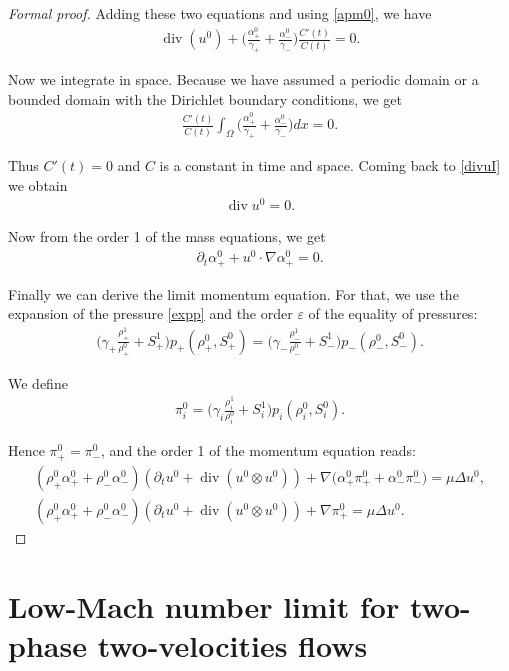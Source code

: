 \documentclass[11pt, twoside, a4paper]{article}
\theoremstyle{plain}
\theoremstyle{remark}
\numberwithin{equation}{section}
\renewcommand{\div}{\operatorname{div}}
\newcommand{\dt}{\partial_t}
\newcommand{\eps}{\varepsilon}
\newcommand{\ap}{\alpha_+}
\newcommand{\am}{\alpha_-}
\newcommand{\rp}{\rho_+}
\newcommand{\rmi}{\rho_-}
\newcommand{\gp}{\gamma_{+}}
\newcommand{\gm}{\gamma_-}
\begin{document}
\begin{proof}[Formal proof]
Adding these two equations and using \eqref{apm0}, we have
\begin{align}
    \div (u^0) + \Big( \frac{\ap^0}{\gp} + \frac{\am^0}{\gm} \Big) \frac{C'(t)}{C(t)}=0.\label{divuI}
\end{align}

Now we integrate in space. Because we have assumed a periodic domain or a bounded domain with the Dirichlet boundary conditions, we get
\begin{align*}
    \frac{C'(t)}{C(t)} \int_\Omega \Big( \frac{\ap^0}{\gp} + \frac{\am^0}{\gm} \Big) d x   =0.
\end{align*}

Thus $C'(t) = 0$ and $C$ is a constant in time and space. Coming back to \eqref{divuI} we obtain
\begin{align*}
    \div u^0 = 0.
\end{align*}

Now from the order 1 of the mass equations, we get
\begin{align*}
    \dt \ap^0 + u^0 \cdot \nabla \ap^0 =0.
\end{align*}

Finally we can derive the limit momentum equation. For that, we use the expansion of the pressure \eqref{expp} and the order $\eps$ of the equality of pressures:
\begin{align*}
    \Big( \gamma_+ \frac{\rp^1}{\rp^0} + S_+^1 \Big) p_+(\rp^0,S_+^0) = \Big( \gm \frac{\rmi^1}{\rmi^0} + S_-^1 \Big) p_-(\rmi^0,S_-^0).
\end{align*}

We define
\begin{align*}
    \pi_i^0 = \Big( \gamma_i \frac{\rho_i^1}{\rho_i^0} + S_i^1 \Big) p_i(\rho_i^0,S_i^0).
\end{align*}

Hence $\pi_+^0 = \pi_-^0$, and the order 1 of the momentum equation reads:
\begin{align*}
    \left(\rp^0 \ap^0 + \rmi^0 \am^0 \right) \left( \dt u^0 + \div (u^0 \otimes u^0)\right) + \nabla \Big(\ap^0 \pi_+^0 + \am^0 \pi_-^0  \Big) = \mu \Delta u^0, \nonumber \\
    \left(\rp^0 \ap^0 + \rmi^0 \am^0 \right) \left( \dt u^0 + \div (u^0 \otimes u^0)\right) + \nabla \pi_+^0 = \mu \Delta u^0.
\end{align*}
\end{proof}


\section{Low-Mach number limit for two-phase two-velocities flows}\label{sec2P2U}
\end{document}
